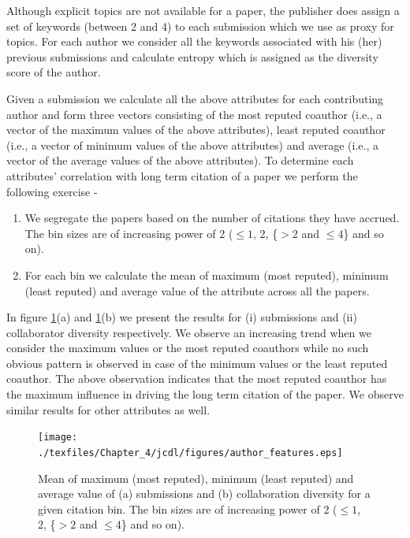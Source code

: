 Although explicit topics are not available for a paper, the publisher does assign a set of keywords (between 2 and 4) to each submission which we use as proxy for topics. For each author we consider all the keywords associated with his (her) previous submissions and calculate entropy which is assigned as the diversity score of the author.

Given a submission we calculate all the above attributes for each contributing author and form three vectors consisting of the most reputed coauthor (i.e., a vector of the maximum values of the above attributes), least reputed coauthor (i.e., a vector of minimum values of the above attributes) and average (i.e., a vector of the average values of the above attributes). To determine each attributes' correlation with long term citation of a paper we perform the following exercise - 
\begin{enumerate}
 \item We segregate the papers based on the number of citations they have accrued. The bin sizes are of increasing power of 2 ($\leq 1$, 2, \{$> 2$ and $\leq 4$\} and so on).
 \item For each bin we calculate the mean of maximum (most reputed), minimum (least reputed) and average value of the attribute across all the papers.
\end{enumerate}


In figure \ref{fig:author}(a) and \ref{fig:author}(b) we present the results for (i) submissions and (ii) collaborator diversity respectively. We observe an increasing trend when we consider the maximum values or the most reputed coauthors while no such obvious pattern is observed in case of the minimum values or the least reputed coauthor. The above observation indicates that the most reputed coauthor has the maximum influence in driving the long term citation of the paper. We observe similar results for other attributes as well. 

\begin{figure}
\centering
\texttt{[image: ./texfiles/Chapter\_4/jcdl/figures/author\_features.eps]}
\caption{Mean of maximum (most reputed), minimum (least reputed) and average value of (a) submissions and (b) collaboration diversity for a given citation bin. The bin sizes are of increasing power of 2 ($\leq 1$, 2, \{$> 2$ and $\leq 4$\} and so on).\vspace{4mm}}
\label{fig:author}
\end{figure}

